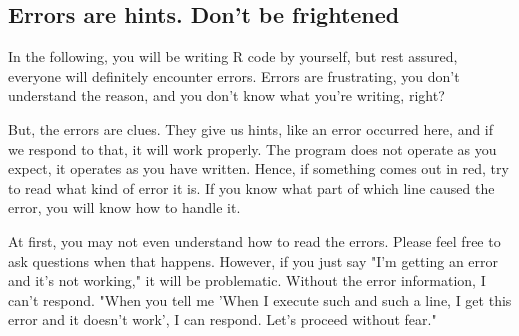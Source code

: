 \documentclass{ltjsbook}
\begin{document}
\subsection{Errors are hints. Don't be frightened}
\label{DontBeAfraid}
In the following, you will be writing R code by yourself, but rest assured, everyone will definitely encounter errors.
Errors are frustrating, you don't understand the reason, and you don't know what you're writing, right?

But, the errors are clues. They give us hints, like an error occurred here, and if we respond to that, it will work properly.
The program does not operate as you expect, it operates as you have written.
Hence, if something comes out in red, try to read what kind of error it is. If you know what part of which line caused the error, you will know how to handle it.

At first, you may not even understand how to read the errors. Please feel free to ask questions when that happens. However, if you just say "I'm getting an error and it's not working," it will be problematic. Without the error information, I can't respond.
"When you tell me 'When I execute such and such a line, I get this error and it doesn't work', I can respond. Let's proceed without fear."



\end{document}
